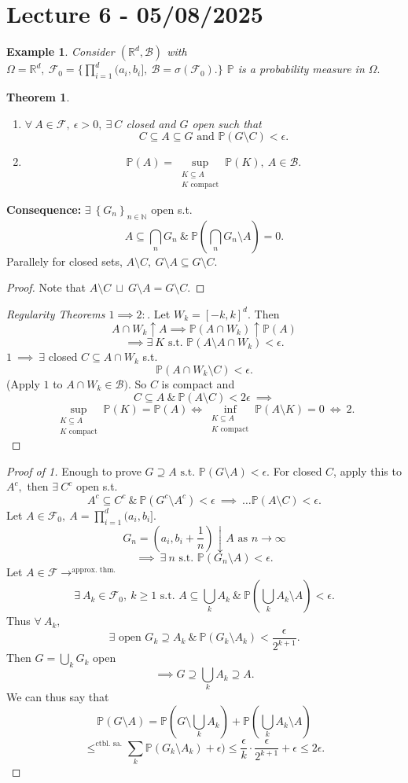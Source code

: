\documentclass{article}
\newcommand{\1}{\mathds{1}}
\newcommand{\R}{\mathbb{R}}
\newcommand{\N}{\mathbb{N}}
\newcommand{\F}{\mathcal{F}}
\newcommand{\B}{\mathcal{B}}
\newcommand{\PB}{\mathbb{P}}
\newcommand{\lf}{\left}
\newcommand{\rg}{\right}
\newcommand{\f}[2]{\frac{#1}{#2}}
\newcommand{\en}[3]{\lf\{{#1}_{#2}\rg\}_{#2\in #3}}
\newcommand{\sm}{\setminus}
\newcommand{\st}{\text{ s.t. }}
\newtheorem{theorem}{Theorem}[section]
\newtheorem{example}{Example}
\begin{document}
\section{Lecture 6 - 05/08/2025}
\begin{example}
   Consider $(\R^d,\B)$ with $\Omega=\R^d,\ \F_0=\{\prod_{i=1}^d(a_i,b_i],\ \B=\sigma(\F_0).\}$ $\PB$ is a probability measure in $\Omega.$
\end{example}
\begin{theorem}
    \begin{enumerate}
        \item $\forall\ A\in\F,\ \epsilon>0,\ \exists\ C$ closed and $G$ open such that $$C\subseteq A\subseteq G\text{ and }\PB(G\sm C)<\epsilon.$$
        \item $$\PB(A)=\sup_{\substack{K\subseteq A\\K\text{ compact}}}\PB(K),\ A\in\B.$$
    \end{enumerate}
\end{theorem}
\textbf{Consequence:} $\exists\ \en Gn\N$ open s.t. $$A\subseteq\bigcap_n G_n\ \&\ \PB\lf(\bigcap_n G_n\sm A\rg)=0.$$ Parallely for closed sets, $A\sm C,\ G\sm A\subseteq G\sm C.$ 
\begin{proof}
    Note that $A\sm C\ \sqcup\ G\sm A=G\sm C.$
\end{proof}
\begin{proof}[Regularity Theorems $1\implies 2:$]
   Let $W_k=[-k,k]^d.$ Then $$A\cap W_k\uparrow A\implies \PB(A\cap W_k)\uparrow \PB(A)$$$$\implies \exists\ K\st\PB(A\sm A\cap W_k)<\epsilon.$$
$1\ \implies\ \exists$ closed $C\subseteq A\cap W_k$ s.t. $$\PB(A\cap W_k\sm C)<\epsilon.$$ (Apply $1$ to $A\cap W_k\in \B).$ So $C$ is compact and $$C\subseteq A\ \&\ \PB(A\sm C)<2\epsilon\ \implies$$ $$\sup_{\substack{K\subseteq A\\K\text{ compact}}}\PB(K)=\PB(A)\iff \inf_{\substack{K\subseteq A\\K\text{ compact}}}\PB(A\sm K)=0\ \iff\ 2.$$ 
\end{proof}
\begin{proof}[Proof of 1]
    Enough to prove $G\supseteq A\st\PB(G\sm A)<\epsilon.$ For closed $C$, apply this to $A^c,$ then $\exists\ C^c$ open s.t. $$A^c\subseteq C^c\ \&\ \PB(G^c\sm A^c)<\epsilon\ \implies\ \ldots \PB(A\sm C)<\epsilon.$$ Let $A\in\F_0,\ A=\prod_{i=1}^d (a_i,b_i].$ $$G_n=\lf(a_i,b_i+\f1n\rg)\downarrow A\text{ as }n\to\infty$$$$\implies\ \exists\ n\st\PB(G_n\sm A)<\epsilon.$$ Let $A\in\F\to^{\text{approx. thm.}}$ $$\exists\ A_k\in\F_0,\ k\geq 1\st A\subseteq \bigcup_k A_k\ \&\ \PB \lf(\bigcup_k A_k\sm A\rg)<\epsilon.$$ Thus $\forall\ A_k,$ $$ \exists\text{ open }G_k\supseteq A_k\ \&\ \PB(G_k\sm A_k)<\f\epsilon{2^{k+1}}.$$ Then $G=\bigcup_k G_k$ open $$\implies G\supseteq\bigcup_k A_k\supseteq A.$$ We can thus say that $$\PB(G\sm A)=\PB\lf(G\sm\bigcup_k A_k\rg)+\PB\lf(\bigcup_k A_k\sm A\rg)$$$$\leq^{\text{ctbl. sa.}}\sum_k\PB(G_k\sm A_k)+\epsilon)\leq \f\epsilon k\cdot \f\epsilon {2^{k+1}}+\epsilon\leq 2\epsilon.$$
\end{proof}
\end{document}
